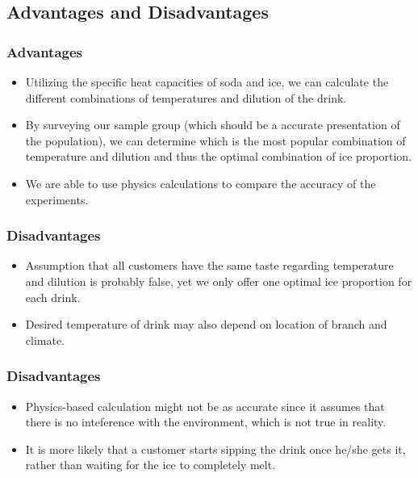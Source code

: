 \documentclass[compress,handout,10pt]{beamer}
\let\olditem\item
\renewcommand{\item}{\setlength{\itemsep}{0.5\baselineskip}\olditem}
\begin{document}
\subsection{Advantages and Disadvantages}
\begin{frame}
    \frametitle{Advantages}

\begin {itemize}
\item Utilizing the specific heat capacities of soda and ice, we can calculate the different combinations of temperatures and dilution of the drink.
\item By surveying our sample group (which should be a accurate presentation of the population), we can determine which is the most popular combination of temperature and dilution and thus the optimal combination of ice proportion.
\item We are able to use physics calculations to compare the accuracy of the experiments.
\end{itemize}

\end{frame}

\begin{frame}
    \frametitle{Disadvantages}

\begin{itemize}
\item Assumption that all customers have the same taste regarding temperature and dilution is probably false, yet we only offer one optimal ice proportion for each drink.
\item Desired temperature of drink may also depend on location of branch and climate.

\end{itemize}

\end{frame}

\begin{frame}
    \frametitle{Disadvantages}

\begin{itemize}

\item Physics-based calculation might not be as accurate since it assumes that there is no inteference with the environment, which is not true in reality.
\item It is more likely that a customer starts sipping the drink once he/she gets it, rather than waiting for the ice to completely melt.
\end{itemize}

\end{frame}
\end{document}
